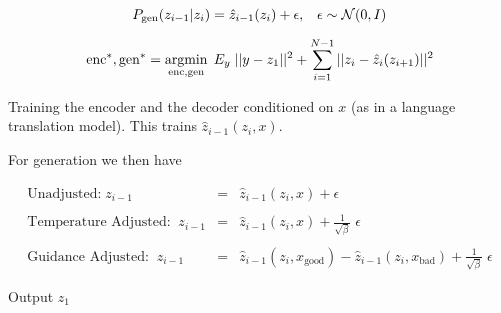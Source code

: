 {$$P_{\mathrm{gen}}(z_{i-1}|z_i) = \hat{z}_{i-1}(z_i) + \epsilon,\;\;\;\epsilon\sim {\cal N}(0,I)$$

$$\mathrm{enc}^*,\mathrm{gen}^* = \operatorname*{argmin}_{\mathrm{enc},\mathrm{gen}} \;E_y\;||y - z_1||^2 + \sum_{i=1}^{N-1} ||z_i - \hat{z}_i(z_{i+1})||^2$$


Training the encoder and the decoder conditioned on $x$ (as in a language translation model).
This trains $\hat{z}_{i-1}(z_i,x)$.

\vfill
For generation we then have

{\huge
\begin{eqnarray*}
\mbox{Unadjusted:} \;z_{i-1} & = & \hat{z}_{i-1}(z_i,x) + \epsilon \\
\\
\mbox{Temperature Adjusted:}\;\;z_{i-1} & = & \hat{z}_{i-1}(z_i,x) + \frac{1}{\sqrt{\beta}}\;\epsilon \\
\\
\mbox{Guidance Adjusted:} \;\;z_{i-1} & = & \hat{z}_{i-1}(z_i,x_\mathrm{good}) - \hat{z}_{i-1}(z_i,x_\mathrm{bad}) + \frac{1}{\sqrt{\beta}}\;\epsilon
\end{eqnarray*}
}

\vfill
Output $z_1$

}



